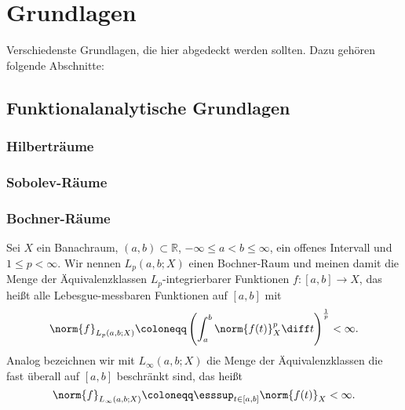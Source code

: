 
\chapter{Grundlagen} %
\label{cha:grundlagen}

Verschiedenste Grundlagen, die hier abgedeckt werden sollten. 
Dazu gehören folgende Abschnitte:

\section{Funktionalanalytische Grundlagen} %
\label{sec:funktionalanalytische_grundlagen}

\subsection{Hilberträume} %
\label{sub:hilbertr_ume}


\subsection{Sobolev-Räume} %
\label{sub:sobolev_r_ume}


\subsection{Bochner-Räume} %
\label{sub:bochner_r_ume}

\begin{Definition}
    Sei $X$ ein Banachraum, $(a, b) \subset \mathbb{R}$, $- \infty \leq a < b \leq \infty$, ein offenes Intervall und $1 \leq p < \infty$.
    Wir nennen $L_{p}(a, b; X)$ einen Bochner-Raum und meinen damit die Menge der Äquivalenzklassen $L_{p}$-integrierbarer Funktionen $f \colon [a, b] \to X$, das heißt alle Lebesgue-messbaren Funktionen auf $[a, b]$ mit
    \begin{equation}
        \norm{f}_{L_{p}(a, b; X)} \coloneqq \left( \int_{a}^{b} \norm{f(t)}_{X}^{p} \diff t \right)^{\frac 1 p} < \infty.
    \end{equation}
    Analog bezeichnen wir mit $L_{\infty}(a, b; X)$ die Menge der Äquivalenzklassen die fast überall auf $[a, b]$ beschränkt sind, das heißt
    \begin{equation}
        \norm{f}_{L_{\infty}(a, b; X)} \coloneqq \esssup_{t \in [a, b]} \norm{f(t)}_{X} < \infty.
    \end{equation}
\end{Definition}

